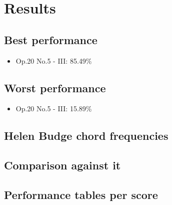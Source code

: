 \chapter{Results}
\label{chap:results}

\section{Best performance}
\begin{itemize}
  \item Op.20 No.5 - III: 85.49\%
\end{itemize}
\section{Worst performance}
\begin{itemize}
  \item Op.20 No.5 - III: 15.89\%
\end{itemize}
\section{Helen Budge chord frequencies}
\section{Comparison against it}
\section{Performance tables per score}
\newpage
